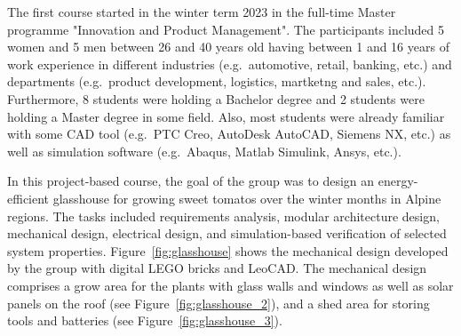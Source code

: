 \documentclass{PDS}
\begin{document}
The first course started in the winter term 2023 in the full-time Master programme "Innovation and Product Management".
The participants included 5 women and 5 men between 26 and 40 years old having between 1 and 16 years of work experience in different industries (e.g.\ automotive, retail, banking, etc.) and departments (e.g.\ product development, logistics, martketng and sales, etc.).
Furthermore, 8 students were holding a Bachelor degree and 2 students were holding a Master degree in some field.
Also, most students were already familiar with some CAD tool (e.g.\ PTC Creo, AutoDesk AutoCAD, Siemens NX, etc.) as well as simulation software (e.g.\ Abaqus, Matlab Simulink, Ansys, etc.).

In this project-based course, the goal of the group was to design an energy-efficient glasshouse for growing sweet tomatos over the winter months in Alpine regions.
The tasks included requirements analysis, modular architecture design, mechanical design, electrical design, and simulation-based verification of selected system properties.
Figure~\ref{fig:glasshouse} shows the mechanical design developed by the group with digital LEGO bricks and LeoCAD.
The mechanical design comprises a grow area for the plants with glass walls and windows as well as solar panels on the roof (see Figure~\ref{fig:glasshouse_2}), and a shed area for storing tools and batteries (see Figure~\ref{fig:glasshouse_3}).
\end{document}

